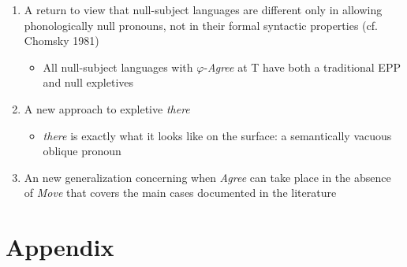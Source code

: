 \documentclass[letterpaper,10pt]{handout_nick}
\begin{document}
\begin{itemize}
\begin{enumerate}
\item A return to view that null-subject languages are different only in allowing phonologically null pronouns, not in their formal syntactic properties (cf. Chomsky 1981)
\begin{itemize}
\item All null-subject languages with $\varphi$-\emph{Agree} at T have both a traditional EPP and null expletives
\end{itemize}
\item A new approach to expletive \emph{there}
\begin{itemize}
\item \emph{there} is exactly what it looks like on the surface: a semantically vacuous oblique pronoun
\end{itemize}
\item An new generalization concerning when \emph{Agree} can take place in the absence of \emph{Move} that covers the main cases documented in the literature
\end{enumerate}
\end{itemize}

\newpage
{\small %

\setlength{\bibsep}{0pt}

}

\section*{Appendix}
\end{document}
